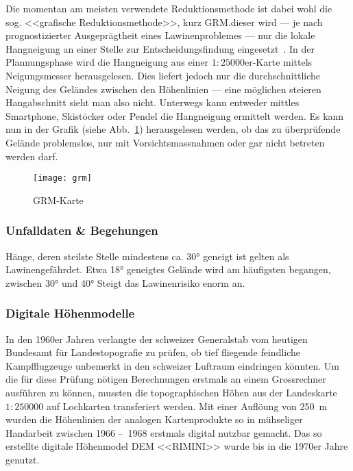 Die momentan am meisten verwendete Reduktionsmethode ist dabei wohl die sog. <<grafische Reduktionsmethode>>, kurz GRM.\@Bei dieser wird --- je nach prognostizierter Ausgeprägtheit eines Lawinenproblemes --- nur die lokale Hangneigung an einer Stelle zur Entscheidungsfindung eingesetzt~\cite{sacbergspwinter}. In der Plannungsphase wird die Hangneigung aus einer $1:25000$er-Karte mittels Neigungsmesser herausgelesen. Dies liefert jedoch nur die durchschnittliche Neigung des Geländes zwischen den Höhenlinien --- eine möglichen steieren Hangabschnitt sieht man also nicht.
Unterwegs kann entweder mittles Smartphone, Skistöcker oder Pendel die Hangneigung ermittelt werden. Es kann nun in der Grafik (siehe Abb.\ \ref{fig:grm}) herausgelesen werden, ob das zu überprüfende Gelände problemslos, nur mit Vorsichtsmassnahmen oder gar nicht betreten werden darf.

\begin{figure}[H]
  \centering
  \texttt{[image: grm]}
  \caption{GRM-Karte~\cite{achtunglawine}}\label{fig:grm}
\end{figure}



\subsubsection{Unfalldaten \& Begehungen}

Hänge, deren steilste Stelle mindestens ca. 30° geneigt ist gelten als Lawinengefährdet. Etwa 18° geneigtes Gelände wird am häufigsten begangen, zwischen 30° und 40° Steigt das Lawinenrisiko enorm an.~\cite{sacbergspwinterp99} 






\subsubsection{Digitale Höhenmodelle}

In den 1960er Jahren verlangte der schweizer Generalstab vom heutigen Bundesamt für Landestopografie zu prüfen, ob tief fliegende feindliche Kampfflugzeuge unbemerkt in den schweizer Luftraum eindringen könnten. Um die für diese Prüfung nötigen Berechnungen erstmals an einem Grossrechner ausführen zu können, mussten die topographischen Höhen aus der Landeskarte $1:250000$ auf Lochkarten transferiert werden. Mit einer Auflöung von \qty{250}{m} wurden die Höhenlinien der analogen Kartenprodukte so in mühseliger Handarbeit zwischen 1966 --~1968 erstmals digital nutzbar gemacht. Das so erstellte digitale Höhenmodel DEM <<RIMINI>> wurde bis in die 1970er Jahre genutzt.~\cite{swisstopohistdem}

